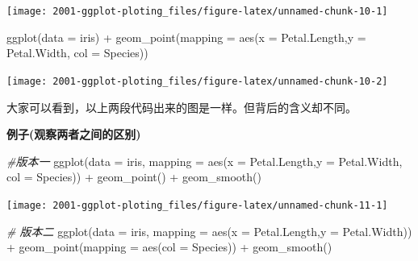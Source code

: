 \documentclass[
]{book}
\newenvironment{Shaded}{\begin{snugshade}}{\end{snugshade}}
\newcommand{\AttributeTok}[1]{\textcolor[rgb]{0.77,0.63,0.00}{#1}}
\newcommand{\CommentTok}[1]{\textcolor[rgb]{0.56,0.35,0.01}{\textit{#1}}}
\newcommand{\FunctionTok}[1]{\textcolor[rgb]{0.00,0.00,0.00}{#1}}
\newcommand{\NormalTok}[1]{#1}
\newcommand{\SpecialCharTok}[1]{\textcolor[rgb]{0.00,0.00,0.00}{#1}}
\begin{document}
\begin{center}\texttt{[image: 2001-ggplot-ploting\_files/figure-latex/unnamed-chunk-10-1]} \end{center}

\begin{Shaded}
\begin{Highlighting}[]
\FunctionTok{ggplot}\NormalTok{(}\AttributeTok{data =}\NormalTok{ iris) }\SpecialCharTok{+}
  \FunctionTok{geom\_point}\NormalTok{(}\AttributeTok{mapping =} \FunctionTok{aes}\NormalTok{(}\AttributeTok{x =}\NormalTok{ Petal.Length,}\AttributeTok{y =}\NormalTok{ Petal.Width, }\AttributeTok{col =}\NormalTok{ Species))}
\end{Highlighting}
\end{Shaded}

\begin{center}\texttt{[image: 2001-ggplot-ploting\_files/figure-latex/unnamed-chunk-10-2]} \end{center}

大家可以看到，以上两段代码出来的图是一样。但背后的含义却不同。

\textbf{例子(观察两者之间的区别)}

\begin{Shaded}
\begin{Highlighting}[]
\CommentTok{\#版本一}
\FunctionTok{ggplot}\NormalTok{(}\AttributeTok{data =}\NormalTok{ iris, }\AttributeTok{mapping =} \FunctionTok{aes}\NormalTok{(}\AttributeTok{x =}\NormalTok{ Petal.Length,}\AttributeTok{y =}\NormalTok{ Petal.Width, }\AttributeTok{col =}\NormalTok{ Species)) }\SpecialCharTok{+}
  \FunctionTok{geom\_point}\NormalTok{() }\SpecialCharTok{+} 
  \FunctionTok{geom\_smooth}\NormalTok{() }
\end{Highlighting}
\end{Shaded}

\begin{center}\texttt{[image: 2001-ggplot-ploting\_files/figure-latex/unnamed-chunk-11-1]} \end{center}

\begin{Shaded}
\begin{Highlighting}[]
\CommentTok{\# 版本二}
\FunctionTok{ggplot}\NormalTok{(}\AttributeTok{data =}\NormalTok{ iris, }\AttributeTok{mapping =} \FunctionTok{aes}\NormalTok{(}\AttributeTok{x =}\NormalTok{ Petal.Length,}\AttributeTok{y =}\NormalTok{ Petal.Width)) }\SpecialCharTok{+}
  \FunctionTok{geom\_point}\NormalTok{(}\AttributeTok{mapping =} \FunctionTok{aes}\NormalTok{(}\AttributeTok{col =}\NormalTok{ Species)) }\SpecialCharTok{+} 
  \FunctionTok{geom\_smooth}\NormalTok{()}
\end{Highlighting}
\end{Shaded}
\end{document}
